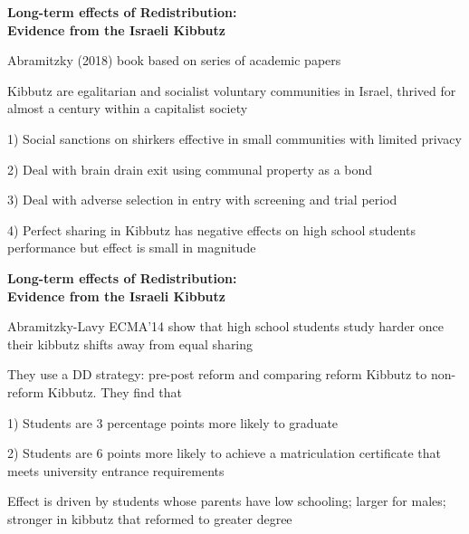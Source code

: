 \documentclass[landscape]{slides}
\begin{document}
\begin{slide}
\begin{center}
{\bf Long-term effects of Redistribution: \\ Evidence from the Israeli Kibbutz}
\end{center}
Abramitzky (2018) book based on series of academic papers

Kibbutz are egalitarian and socialist voluntary communities in Israel, thrived for
almost a century within a capitalist society

1) Social sanctions on shirkers effective in small communities with limited privacy

2) Deal with brain drain exit using communal property as a bond

3) Deal with adverse selection in entry with screening and trial period

4) Perfect sharing in Kibbutz has negative effects on high school students performance
but effect is small in magnitude %

\end{slide}

\begin{slide}
\begin{center}
{\bf Long-term effects of Redistribution: \\ Evidence from the Israeli Kibbutz}
\end{center}
Abramitzky-Lavy ECMA'14 show that
high school students study harder once their
kibbutz shifts away from equal sharing

They use a DD strategy: pre-post reform and comparing reform Kibbutz to non-reform Kibbutz.
They find that

1) Students are 3 percentage points more likely to graduate

2)  Students are 6 points more likely to achieve a matriculation
certificate that meets university entrance requirements


Effect is driven by students whose parents have
low schooling; larger for males; stronger in
kibbutz that reformed to greater degree

\end{slide}
\end{document}
